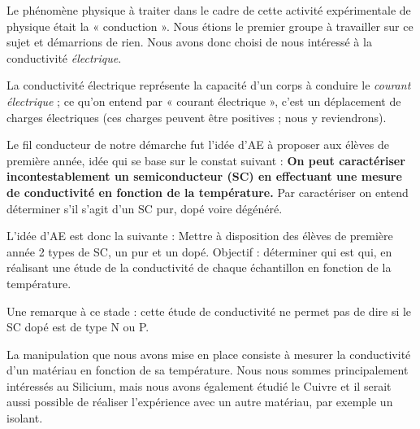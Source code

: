 Le phénomène physique à traiter dans le cadre de cette activité expérimentale de physique était la « conduction ». 
Nous étions le premier groupe à travailler sur ce sujet et démarrions de rien. 
Nous avons donc choisi de nous intéressé à la conductivité \textit{électrique}.

La conductivité électrique représente la capacité d'un corps à conduire le \textit{courant électrique} ; 
ce qu'on entend par « courant électrique », c'est un déplacement de charges électriques 
(ces charges peuvent être positives ; nous y reviendrons).

\bigskip
Le fil conducteur de notre démarche fut l'idée d'AE à proposer aux élèves de première année, 
idée qui se base sur le constat suivant :
\textbf{On peut caractériser incontestablement un semiconducteur (SC) en effectuant 
une mesure de conductivité en fonction de la température.}
Par caractériser on entend déterminer s'il s'agit d'un SC pur, dopé voire dégénéré.

\bigskip
L'idée d'AE est donc la suivante :
Mettre à disposition des élèves de première année 2 types de SC, un pur et un dopé. 
Objectif : déterminer qui est qui, en réalisant une étude de la conductivité de chaque échantillon 
en fonction de la température.

Une remarque à ce stade : cette étude de conductivité ne permet pas de dire si le SC dopé est de type N ou P.





La manipulation que nous avons mise en place consiste à mesurer la conductivité d'un matériau 
en fonction de sa température. Nous nous sommes principalement intéressés au Silicium, 
mais nous avons également étudié le Cuivre et il serait aussi possible de réaliser 
l'expérience avec un autre matériau, par exemple un isolant.
